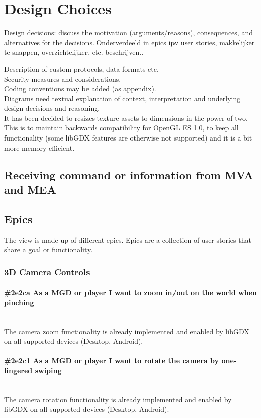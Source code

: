 \documentclass[10pt]{extarticle} %
\newcommand{\myparagraph}[1]{\paragraph{#1}\mbox{}\\} %
\begin{document}
    \newpage

    \section{Design Choices}
    \label{sec:designchoices}
    Design decisions: discuss the motivation (arguments/reasons), consequences,
    and alternatives for the decisions.
    Onderverdeeld in epics ipv user stories, makkelijker te snappen, overzichtelijker, etc. beschrijven..

    Description of custom protocols, data formats etc.\\
    Security measures and considerations.\\
    Coding conventions may be added (as appendix).\\
    Diagrams need textual explanation of context, interpretation and underlying design decisions and reasoning.\\

    It has been decided to resizes texture assets to dimensions in the power of two.
    This is to maintain backwards compatibility for OpenGL ES 1.0, to keep all functionality (some libGDX features are otherwise not supported) and it is a bit more memory efficient.\cite{libgdxpottex}


    \subsection[Communication MVA-MEA]{Receiving command or information from MVA and MEA}
    \label{subsec:comchoice}

    \subsection{Epics}
    \label{subsec:epics}
    The view is made up of different epics.
    Epics are a collection of user stories that share a goal or functionality.

    \newcommand{\clickup}[1]{https://app.clickup.com/757520/761304/t/#1}

    \subsubsection{3D Camera Controls}
    \myparagraph{\href{\clickup{2e2ca}}{\#2e2ca} As a MGD or player I want to zoom in/out on the world when pinching}
    The camera zoom functionality is already implemented and enabled by libGDX on all supported devices (Desktop, Android).
    \myparagraph{\href{\clickup{2e2c1}}{\#2e2c1} As a MGD or player I want to rotate the camera by one-fingered swiping}
    The camera rotation functionality is already implemented and enabled by libGDX on all supported devices (Desktop, Android).
\end{document}
